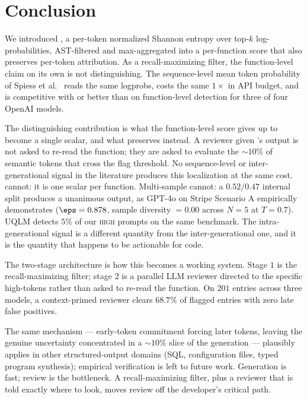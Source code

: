 \section{Conclusion}
\label{sec:conclusion}

We introduced \eps, a per-token normalized Shannon entropy over
top-$k$ log-probabilities, AST-filtered and max-aggregated into a
per-function score that also preserves per-token attribution. As a
recall-maximizing filter, the function-level claim on its own is
not distinguishing. The sequence-level mean token probability \papg
of Spiess et al.~\cite{spiess2025calibration} reads the same
logprobs, costs the same $1\times$ in API budget, and is
competitive with or better than \eps on function-level detection
for three of four OpenAI models.

The distinguishing contribution is what the function-level score
gives up to become a single scalar, and what \eps preserves instead.
A reviewer given \eps's output is not asked to re-read the function;
they are asked to evaluate the $\sim 10\%$ of semantic tokens that
cross the flag threshold. No sequence-level or
inter-generational signal in the literature produces this
localization at the same cost. \papg cannot: it is one scalar per
function. Multi-sample cannot: a $0.52/0.47$ internal split
produces a unanimous output, as GPT-4o on Stripe Scenario A
empirically demonstrates ($\eps = 0.878$, sample diversity $=0.00$
across $N=5$ at $T=0.7$). UQLM detects $5\%$ of our \textsc{high}
prompts on the same benchmark. The intra-generational signal is a
different quantity from the inter-generational one, and it is the
quantity that happens to be actionable for code.

The two-stage architecture is how this becomes a working system.
Stage $1$ is the recall-maximizing filter; stage $2$ is a parallel
LLM reviewer directed to the specific high-\eps tokens rather than
asked to re-read the function. On $201$ entries across three
models, a context-primed reviewer clears $68.7\%$ of flagged entries
with zero late false positives.

The same mechanism --- early-token commitment forcing later tokens,
leaving the genuine uncertainty concentrated in a $\sim 10\%$ slice
of the generation --- plausibly applies in other structured-output
domains (SQL, configuration files, typed program synthesis);
empirical verification is left to future work. Generation is fast;
review is the bottleneck. A recall-maximizing filter, plus a
reviewer that is told exactly where to look, moves review off the
developer's critical path.
